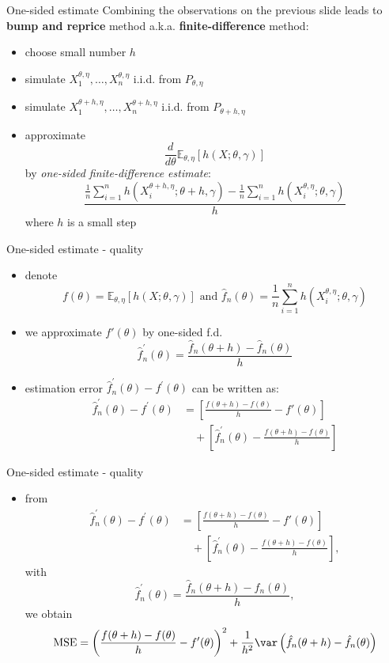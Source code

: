 \documentclass[pdf, handout]{beamer}
\begin{document}
\begin{frame}{One-sided estimate}
Combining the observations on the previous slide leads to
\textbf{bump and reprice} method a.k.a.
\textbf{finite-difference} method:
\begin{itemize}
\item choose small number $h$
\item simulate $X_1^{\theta,\eta},\dots,X_n^{\theta,\eta}$ i.i.d. from 
$P_{\theta,\eta}$
\item simulate $X_1^{\theta+h,\eta},\dots,X_n^{\theta+h,\eta}$ i.i.d. from 
$P_{\theta+h,\eta}$
\item approximate 
\[
\frac{d}{d\theta} \mathbb{E}_{\theta,\eta} [ h(X; \theta, \gamma)]
\]
by \emph{one-sided finite-difference estimate}:
$$
\frac{\frac{1}{n}\sum_{i=1}^n h(X_i^{\theta+h,\eta}; \theta+h,\gamma) - \frac{1}{n}\sum_{i=1}^n h(X_i^{\theta,\eta}; \theta,\gamma)}{h}
$$
where $h$ is a small step
\end{itemize}
\end{frame}

\begin{frame}{One-sided estimate - quality}
\begin{itemize}
\item denote 
\[
f(\theta) = \mathbb{E}_{\theta,\eta} [ h(X; \theta, \gamma)] \text{ and } 
\hat f_n(\theta) = \frac{1}{n}\sum_{i=1}^n h(X_i^{\theta,\eta}; \theta,\gamma)
\]
\item we approximate $f'(\theta)$ by one-sided f.d.
\[ 
\hat{f}_n^\prime(\theta) = \frac{ \hat f_n(\theta+h) - \hat f_n(\theta)}{h}
\]
\item estimation error $\hat{f}_n^\prime(\theta) - f^\prime(\theta)$ can be written as:
\begin{align*}
\hat{f}_n^\prime(\theta) - f^\prime(\theta) &
= \left[ 
\frac{ f(\theta+h) - f(\theta)}{h} - f'(\theta)
\right] \\
&\quad + \left[ \hat{f}_n^\prime(\theta) - \frac{ f(\theta+h) - f(\theta)}{h} \right]
\end{align*}
\end{itemize}
\end{frame}

\begin{frame}{One-sided estimate - quality}
\begin{itemize}
\item from 
\begin{align*}
\hat{f}_n^\prime(\theta) - f^\prime(\theta) &
= \left[ 
\frac{ f(\theta+h) - f(\theta)}{h} - f'(\theta)
\right] \\
&\quad + \left[ \hat{f}_n^\prime(\theta) - \frac{ f(\theta+h) - f(\theta)}{h} \right],
\end{align*}
with \[ 
\hat{f}_n^\prime(\theta) = \frac{ \hat f_n(\theta+h) - \hat f_n(\theta)}{h},
\]
we obtain
\[
\text{MSE} = \left( \frac{ f(\theta+h) - f(\theta)}{h} - f'(\theta)
    \right)^2 +
 \frac{1}{h^2} \var\left(
    \hat f_n(\theta+h) -  \hat f_n(\theta)
    \right)
\]
\end{itemize}
\end{frame}
\end{document}
